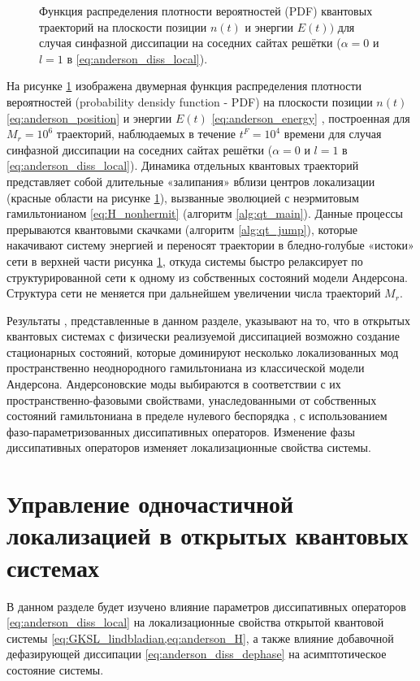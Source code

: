 \begin{figure}[ht]
	\caption{
		Функция распределения плотности вероятностей (PDF) квантовых траекторий на плоскости позиции \(n(t)\) и энергии \(E(t))\) для случая синфазной диссипации на соседних сайтах решётки (\(\alpha=0\) и \(l=1\) в \cref{eq:anderson_diss_local}).
	}
	\label{fig:anderson_qj_1}
\end{figure}

На рисунке \cref{fig:anderson_qj_1} изображена двумерная функция распределения плотности вероятностей (probability densidy function - PDF) на плоскости позиции \(n(t)\) \cref{eq:anderson_position} и энергии \(E(t)\) \cref{eq:anderson_energy} , построенная для \(M_r=10^6\) траекторий, наблюдаемых в течение \(t^F=10^4\) времени для случая синфазной диссипации на соседних сайтах решётки (\(\alpha=0\) и \(l=1\) в \cref{eq:anderson_diss_local}). Динамика отдельных квантовых траекторий представляет собой длительные «залипания» вблизи центров локализации (красные области на рисунке \cref{fig:anderson_qj_1}), вызванные эволюцией с неэрмитовым гамильтонианом \cref{eq:H_nonhermit} (алгоритм \ref{alg:qt_main}). Данные процессы прерываются квантовыми скачками (алгоритм \ref{alg:qt_jump}), которые накачивают систему энергией и переносят траектории в бледно-голубые «истоки» сети в верхней части рисунка \cref{fig:anderson_qj_1}, откуда системы быстро релаксирует по структурированной сети к одному из собственных состояний модели Андерсона. Структура сети не меняется при дальнейшем увеличении числа траекторий \(M_r\).

Результаты \cite{Yusipov2017}, представленные в данном разделе, указывают на то, что в открытых квантовых системах с физически реализуемой диссипацией возможно создание стационарных состояний, которые доминируют несколько локализованных мод пространственно неоднородного гамильтониана из классической модели Андерсона. Андерсоновские моды выбираются в соответствии с их пространственно-фазовыми свойствами, унаследованными от собственных состояний гамильтониана в пределе нулевого беспорядка \cite{Ishii1973}, с использованием фазо-параметризованных диссипативных операторов. Изменение фазы диссипативных операторов изменяет локализационные свойства системы.
 
\section{Управление одночастичной локализацией в открытых квантовых системах}\label{sec:ch1/epjb}
В данном разделе будет изучено влияние параметров диссипативных операторов \cref{eq:anderson_diss_local} на локализационные свойства открытой квантовой системы \cref{eq:GKSL_lindbladian,eq:anderson_H}, а также влияние добавочной дефазирующей диссипации \cref{eq:anderson_diss_dephase} на асимптотическое состояние системы.

